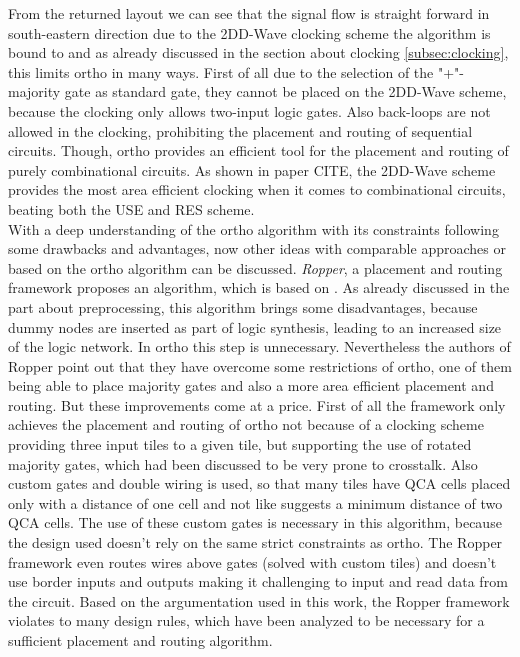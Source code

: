 From the returned layout we can see that the signal flow is straight forward in south-eastern direction due to the 2DD-Wave clocking scheme the algorithm is bound to and as already discussed in the section about clocking \ref{subsec:clocking}, this limits ortho in many ways. First of all due to the selection of the "+"-majority gate as standard gate, they cannot be placed on the 2DD-Wave scheme, because the clocking only allows two-input logic gates. Also back-loops are not allowed in the clocking, prohibiting the placement and routing of sequential circuits. Though, ortho provides an efficient tool for the placement and routing of purely combinational circuits. As shown in paper CITE, the 2DD-Wave scheme provides the most area efficient clocking when it comes to combinational circuits, beating both the USE and RES scheme.\\
With a deep understanding of the ortho algorithm with its constraints following some drawbacks and advantages, now other ideas with comparable approaches or based on the ortho algorithm can be discussed. \textit{Ropper}, a placement and routing framework \cite{ropper} proposes an algorithm, which is based on \cite{trindade2016placement}. As already discussed in the part about preprocessing, this algorithm brings some disadvantages, because dummy nodes are inserted as part of logic synthesis, leading to an increased size of the logic network. In ortho this step is unnecessary. Nevertheless the authors of Ropper point out that they have overcome some restrictions of ortho, one of them being able to place majority gates and also a more area efficient placement and routing. But these improvements come at a price. First of all the framework only achieves the placement and routing of ortho not because of a clocking scheme providing three input tiles to a given tile, but supporting the use of rotated majority gates, which had been discussed to be very prone to crosstalk. Also custom gates and double wiring is used, so that many tiles have QCA cells placed only with a distance of one cell and not like \cite{crosstalk} suggests a minimum distance of two QCA cells. The use of these custom gates is necessary in this algorithm, because the design used doesn't rely on the same strict constraints as ortho. The Ropper framework even routes wires above gates (solved with custom tiles) and doesn't use border inputs and outputs making it challenging to input and read data from the circuit. Based on the argumentation used in this work, the Ropper framework violates to many design rules, which have been analyzed to be necessary for a sufficient placement and routing algorithm.\\
